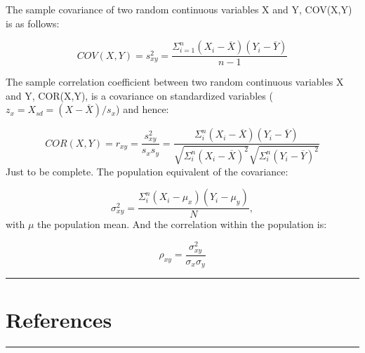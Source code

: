 \documentclass[
]{book}
\begin{document}
The sample covariance of two random continuous variables X and Y, COV(X,Y) is as follows:

\[COV(X,Y)=s_{xy}^2 = \frac{\Sigma^n_{i=1}(X_i-\overline{X})(Y_i-\overline{Y})}{n-1}\]

The sample correlation coefficient between two random continuous variables X and Y, COR(X,Y), is a covariance on standardized variables (\(z_x=X_{sd}=(X-\overline{X})/s_x\)) and hence:

\[COR(X,Y)=r_{xy} = \frac{s_{xy}^2}{s_x s_y}= \frac{\Sigma^n_i(X_i-\overline{X})(Y_i-\overline{Y})}{\sqrt{\Sigma^n_i(X_i-\overline{X})^2}\sqrt{\Sigma^n_i(Y_i-\overline{Y})^2}}\]
Just to be complete. The population equivalent of the covariance:

\[\sigma _{xy}^2 = \frac{\Sigma^n_i(X_i - \mu_x)(Y_i-\mu_y)}{N},\]
with \(\mu\) the population mean.
And the correlation within the population is:

\[\rho_{xy} = \frac{\sigma_{xy}^2}{\sigma_x \sigma_y}\]

\begin{center}\rule{0.5\linewidth}{0.5pt}\end{center}

\hypertarget{references}{%
\chapter*{References}\label{references}}

\hypertarget{refs}{}

\begin{center}\rule{0.5\linewidth}{0.5pt}\end{center}

  
\end{document}
